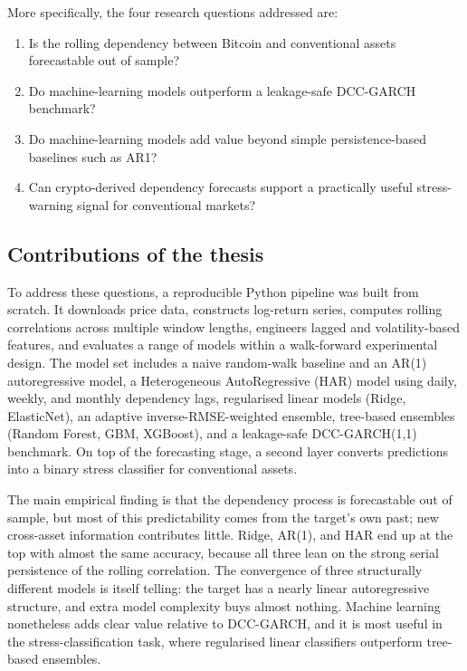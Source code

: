 More specifically, the four research questions addressed are:

\begin{enumerate}
    \item Is the rolling dependency between Bitcoin and conventional assets forecastable out of sample?
    \item Do machine-learning models outperform a leakage-safe DCC-GARCH benchmark?
    \item Do machine-learning models add value beyond simple persistence-based baselines such as AR1?
    \item Can crypto-derived dependency forecasts support a practically useful stress-warning signal for conventional markets?
\end{enumerate}

\subsection{Contributions of the thesis}

To address these questions, a reproducible Python pipeline was built from scratch. It downloads price data, constructs log-return series, computes rolling correlations across multiple window lengths, engineers lagged and volatility-based features, and evaluates a range of models within a walk-forward experimental design. The model set includes a naive random-walk baseline and an AR(1) autoregressive model, a Heterogeneous AutoRegressive (HAR) model using daily, weekly, and monthly dependency lags, regularised linear models (Ridge, ElasticNet), an adaptive inverse-RMSE-weighted ensemble, tree-based ensembles (Random Forest, GBM, XGBoost), and a leakage-safe DCC-GARCH(1,1) benchmark. On top of the forecasting stage, a second layer converts predictions into a binary stress classifier for conventional assets.

The main empirical finding is that the dependency process is forecastable out of sample, but most of this predictability comes from the target's own past; new cross-asset information contributes little. Ridge, AR(1), and HAR end up at the top with almost the same accuracy, because all three lean on the strong serial persistence of the rolling correlation. The convergence of three structurally different models is itself telling: the target has a nearly linear autoregressive structure, and extra model complexity buys almost nothing. Machine learning nonetheless adds clear value relative to DCC-GARCH, and it is most useful in the stress-classification task, where regularised linear classifiers outperform tree-based ensembles.


